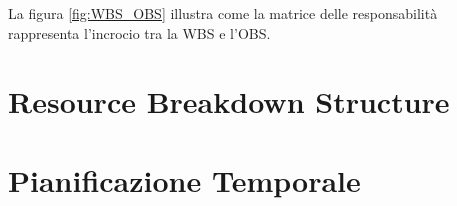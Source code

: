 La figura \ref{fig:WBS_OBS} illustra come la matrice delle responsabilità rappresenta l'incrocio tra la WBS e l'OBS.


\section{Resource Breakdown Structure}
\section{Pianificazione Temporale}
